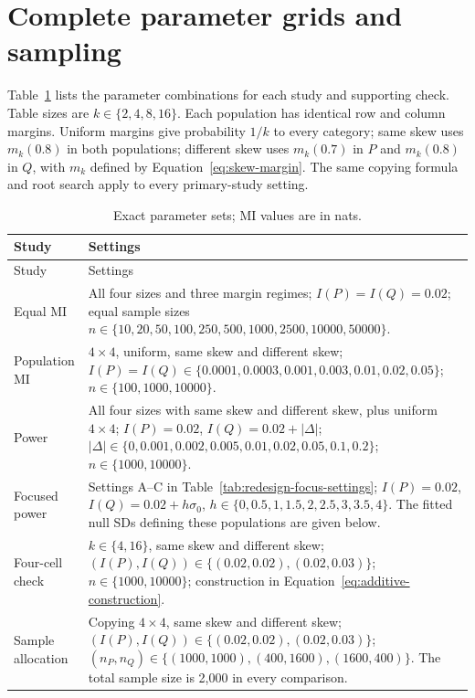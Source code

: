 \section{Complete parameter grids and sampling}

Table~\ref{tab:exact-grids} lists the parameter combinations for each study
and supporting check.
Table sizes are \(k\in\{2,4,8,16\}\). Each population has identical
row and column margins. Uniform margins give probability \(1/k\) to
every category; same skew uses \(m_k(0.8)\) in both populations; different
skew uses \(m_k(0.7)\) in \(P\) and \(m_k(0.8)\) in \(Q\), with
\(m_k\) defined by Equation~\eqref{eq:skew-margin}. The same copying
formula and root search apply to every primary-study setting.

\begin{longtable}{@{}>{\raggedright\arraybackslash}p{}>{\raggedright\arraybackslash}p{}@{}}
\caption{Exact parameter sets; MI values are in nats.}\label{tab:exact-grids}\\
\toprule Study & Settings\\\midrule\endfirsthead
\toprule Study & Settings\\\midrule\endhead
Equal MI & All four sizes and three margin regimes;
\(I(P)=I(Q)=0.02\); equal sample sizes
\(n\in\{10,20,50,100,250,500,1000,2500,10000,50000\}\).\\
Population MI & \(4\times4\), uniform, same skew and different skew;
\(I(P)=I(Q)\in\{0.0001,0.0003,0.001,0.003,0.01,0.02,0.05\}\);
\(n\in\{100,1000,10000\}\).\\
Power & All four sizes with same skew and different skew, plus uniform
\(4\times4\); \(I(P)=0.02\), \(I(Q)=0.02+|\Delta|\);
\(|\Delta|\in\{0,0.001,0.002,0.005,0.01,0.02,0.05,0.1,0.2\}\);
\(n\in\{1000,10000\}\).\\
Focused power & Settings A--C in Table~\ref{tab:redesign-focus-settings};
\(I(P)=0.02\), \(I(Q)=0.02+h\sigma_0\),
\(h\in\{0,0.5,1,1.5,2,2.5,3,3.5,4\}\).
The fitted null SDs defining these populations are given below.\\
Four-cell check & \(k\in\{4,16\}\), same skew and different skew;
\((I(P),I(Q))\in\{(0.02,0.02),(0.02,0.03)\}\);
\(n\in\{1000,10000\}\); construction in
Equation~\eqref{eq:additive-construction}.\\
Sample allocation & Copying \(4\times4\), same skew and different skew;
\((I(P),I(Q))\in\{(0.02,0.02),(0.02,0.03)\}\);
\((n_P,n_Q)\in\{(1000,1000),(400,1600),(1600,400)\}\).
The total sample size is 2,000 in every comparison.\\
\bottomrule
\end{longtable}

